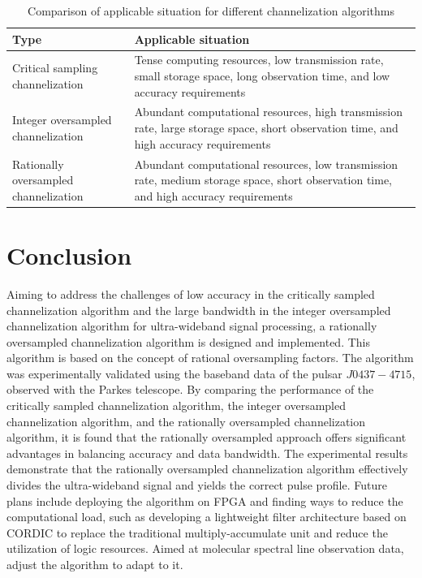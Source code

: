 \documentclass[referee]{raa}
\begin{document}
\begin{table}[!htbp]
\centering
\begin{tabularx}{\textwidth}{l|X}
Type & Applicable situation \\\hline
Critical sampling channelization & Tense computing resources, low transmission rate, small storage space, long observation time, and low accuracy requirements \\
Integer oversampled channelization & Abundant computational resources, high transmission rate, large storage space, short observation time, and high accuracy requirements \\
Rationally oversampled channelization & Abundant computational resources, low transmission rate, medium storage space, short observation time, and high accuracy requirements \\
\end{tabularx}
\caption{\label{tab:situation}Comparison of applicable situation for different channelization algorithms}
\end{table}

\section{Conclusion}

Aiming to address the challenges of low accuracy in the critically sampled channelization algorithm and the large bandwidth in the integer oversampled channelization algorithm for ultra-wideband signal processing, a rationally oversampled channelization algorithm is designed and implemented. This algorithm is based on the concept of rational oversampling factors. The algorithm was experimentally validated using the baseband data of the pulsar $J0437-4715$, observed with the Parkes telescope. By comparing the performance of the critically sampled channelization algorithm, the integer oversampled channelization algorithm, and the rationally oversampled channelization algorithm, it is found that the rationally oversampled approach offers significant advantages in balancing accuracy and data bandwidth. The experimental results demonstrate that the rationally oversampled channelization algorithm effectively divides the ultra-wideband signal and yields the correct pulse profile. 
Future plans include deploying the algorithm on FPGA and finding ways to reduce the computational load, such as developing a lightweight filter architecture based on CORDIC to replace the traditional multiply-accumulate unit and reduce the utilization of logic resources. Aimed at molecular spectral line observation data, adjust the algorithm to adapt to it.
\end{document}
